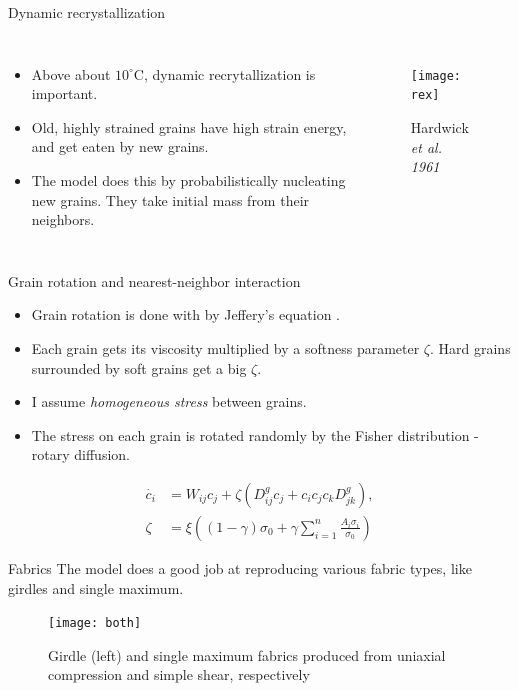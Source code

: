 \documentclass{beamer}
\begin{document}
\begin{frame}{Dynamic recrystallization} 
   \begin{columns}[T]
      \begin{itemize}
         \item Above about $10^{\circ}$C, dynamic recrytallization is important.
         \item Old, highly strained grains have high strain energy, and get eaten by new grains.
         \item The model does this by probabilistically nucleating new grains. They take initial mass from their neighbors.
      \end{itemize}
            \begin{figure}
               \texttt{[image: rex]}
               \caption{Hardwick \it{et al.} 1961}
            \end{figure}
         \end{columns}


\end{frame}

\begin{frame}{Grain rotation and nearest-neighbor interaction}
\begin{itemize}
   \item Grain rotation is done with by Jeffery's equation \citep{jeffery1922}.
   \item Each grain gets its viscosity multiplied by a softness parameter $\zeta$. Hard grains surrounded by soft grains get a big $\zeta$.
   \item I assume \emph{homogeneous stress} between grains.
   \item The stress on each grain is rotated randomly by the Fisher distribution - rotary diffusion.
\end{itemize}
\begin{equation}
\begin{aligned}
   \dot{c_i} &= W_{ij}  c_j + \zeta \left( D^g_{ij} c_j + c_i c_j c_k D^g_{jk} \right), \\
   \zeta &= \xi \left( \left( 1 - \gamma \right)  \sigma_0 + \gamma \sum_{i=1}^n \frac{A_i \sigma_i}{\sigma_0} \right)

\end{aligned}
\end{equation}
\end{frame}

\begin{frame}{Fabrics}
   The model does a good job at reproducing various fabric types, like girdles and single maximum.

\begin{figure}
   \texttt{[image: both]}
      \caption{\small{Girdle (left) and single maximum fabrics produced from uniaxial compression and simple shear, respectively}}
\end{figure}
\end{frame}
\end{document}
